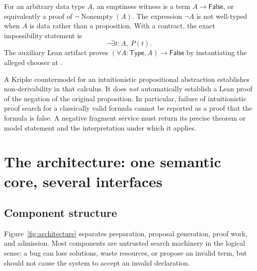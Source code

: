 \documentclass[11pt,letterpaper]{article}
\newcommand{\code}[1]{\texttt{\detokenize{#1}}}
\theoremstyle{definition}\newtheorem{definition}[theorem]{Definition}
\theoremstyle{remark}\newtheorem{remark}[theorem]{Remark}
\begin{document}
For an arbitrary data type $A$, an emptiness witness is a term $A\to\mathsf{False}$,
or equivalently a proof of $\neg\operatorname{Nonempty}(A)$. The expression
$\neg A$ is not well-typed when $A$ is data rather than a proposition. With a
contract, the exact impossibility statement is
\[
 \neg\exists t:A,\ P(t).
\]
The auxiliary Lean artifact proves $(\forall A:\mathsf{Type},A)\to\mathsf{False}$
by instantiating the alleged chooser at \code{Empty}.

A Kripke countermodel for an intuitionistic propositional abstraction establishes
non-derivability in that calculus. It does \emph{not} automatically establish a
Lean proof of the negation of the original proposition. In particular, failure
of intuitionistic proof search for a classically valid formula cannot be
reported as a proof that the formula is false. A negative fragment service must
return its precise theorem or model statement and the interpretation under
which it applies.

\section{The architecture: one semantic core, several interfaces}
\label{sec:architecture}

\subsection{Component structure}

Figure~\ref{fig:architecture} separates preparation, proposal generation, proof
work, and admission. Most components are untrusted search machinery in the
logical sense: a bug can lose solutions, waste resources, or propose an invalid
term, but should not cause the system to accept an invalid declaration.
\end{document}
